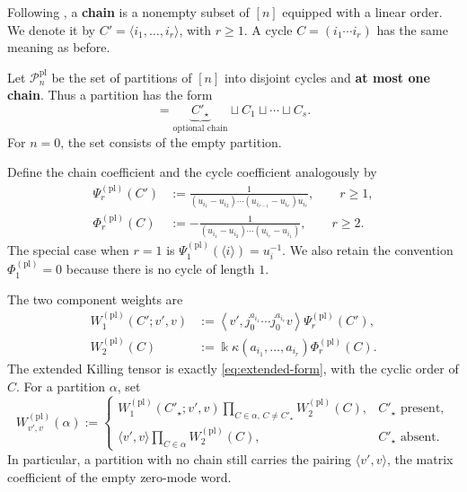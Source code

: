 \documentclass[11pt,a4paper]{amsart}
\numberwithin{equation}{section}
\theoremstyle{definition}
\theoremstyle{remark}
\newcommand{\kk}{\Bbbk}
\newcommand{\cP}{\mathcal P}
\begin{document}
Following \cite{FrenkelZhu}, a \textbf{chain} is a nonempty subset of $[n]$ equipped with a linear order.  We denote it by $C'=\langle i_1,\ldots,i_r\rangle$, with $r\geq1$.  A cycle $C=(i_1\cdots i_r)$ has the same meaning as before.

Let $\cP_n^{\text{pl}}$ be the set of partitions of $[n]$ into
disjoint cycles and \textbf{at most one chain}. Thus a partition has the form
\begin{equation*}
 [n]=\underbrace{C'_\star}_{\text{optional chain}}
 \sqcup C_1\sqcup\cdots\sqcup C_s.
\end{equation*}
For $n=0$, the set consists of the empty partition.

Define the chain coefficient and the cycle coefficient analogously by
\begin{align}
 \Psi_r^{(\mathrm{pl})}(C')
 &:=\frac1{(u_{i_1}-u_{i_2})\cdots
 (u_{i_{r-1}}-u_{i_r})u_{i_r}},
 \qquad r\geq1,
 \label{eq:plane-Psi}\\
 \Phi_r^{(\mathrm{pl})}(C)
 &:=-\frac1{(u_{i_1}-u_{i_2})\cdots
 (u_{i_r}-u_{i_1})},
 \qquad r\geq2.
 \label{eq:plane-Phi}
\end{align}
The special case when $r=1$ is $\Psi_1^{(\mathrm{pl})}(\langle i\rangle)=u_i^{-1}$.  We also retain the convention $\Phi_1^{(\mathrm{pl})}=0$ because there is no cycle of length $1$.

The two component weights are
\begin{align*}
 W_1^{(\mathrm{pl})}(C';v',v)
 &:=\left\langle v',
 j_0^{a_{i_1}}\cdots j_0^{a_{i_r}}v\right\rangle
 \Psi_r^{(\mathrm{pl})}(C'),\\
 W_2^{(\mathrm{pl})}(C)
 &:=\kk\kappa(a_{i_1},\ldots,a_{i_r})
 \Phi_r^{(\mathrm{pl})}(C).
\end{align*}
The extended Killing tensor is exactly \eqref{eq:extended-form}, with
the cyclic order of $C$.  For a partition $\alpha$, set
\begin{equation}
 W_{v',v}^{(\mathrm{pl})}(\alpha)
 :=\begin{cases}
 \displaystyle
 W_1^{(\mathrm{pl})}(C'_\star;v',v)
 \prod_{C\in\alpha,\,C\neq C'_\star}
 W_2^{(\mathrm{pl})}(C),
 &C'_\star\text{ present},\\[2ex]
 \displaystyle
 \langle v',v\rangle\prod_{C\in\alpha}
 W_2^{(\mathrm{pl})}(C),
 &C'_\star\text{ absent}.
 \end{cases}
 \label{eq:plane-partition-weight}
\end{equation}
In particular, a partition with no chain still carries the pairing
$\langle v',v\rangle$, the matrix coefficient of the empty zero-mode
word.
\end{document}
